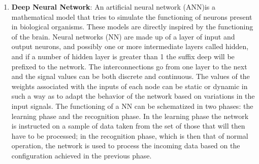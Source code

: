 \documentclass[conference]{IEEEtran}
\begin{document}
\begin{enumerate}
    \item\textbf{Deep Neural Network}: An artificial neural network (ANN)is a mathematical model that tries to simulate the functioning of neurons present in biological organisms. These models are directly inspired by the functioning of the brain. Neural networks (NN) are made up of a layer of input and output neurons, and possibly one or more intermediate layers called hidden, and if a number of hidden layer is greater than 1 the suffix deep will be prefixed to the network. The interconnections go from one layer to the next and the signal values can be both discrete and continuous. The values of the weights associated with the inputs of each node can be static or dynamic in such a way as to adapt the behavior of the network based on variations in the input signals. The functioning of a NN can be schematized in two phases: the learning phase and the recognition phase. In the learning phase the network is instructed on a sample of data taken from the set of those that will then have to be processed; in the recognition phase, which is then that of normal operation, the network is used to process the incoming data based on the configuration achieved in the previous phase.
\end{enumerate}
\end{document}
